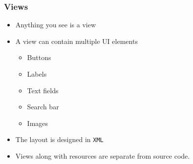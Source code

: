 %
%

\begin{frame}
  \frametitle{Views}
  
  \begin{itemize}
  \item<1-> Anything you see is a view
  
  \item<2->[] A view can contain multiple UI elements
    \begin{itemize}
    \item<3-> Buttons
    \item<4-> Labels
    \item<5-> Text fields
    \item<6-> Search bar
    \item<7-> Images
    \end{itemize}
    
  \item<8-> The layout is designed in \texttt{XML}

  \item<9-> Views along with resources are separate from source code.

  \end{itemize}

\end{frame}


